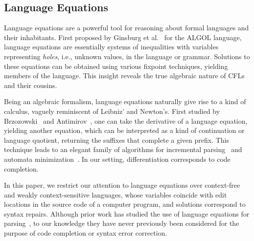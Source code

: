 \documentclass[sigplan,review,anonymous,acmsmall]{acmart}\settopmatter{printfolios=false,printccs=false,printacmref=false}
\begin{document}


\subsection{Language Equations}

Language equations are a powerful tool for reasoning about formal languages and their inhabitants. First proposed by Ginsburg et al.~\cite{ginsburg1962two} for the ALGOL language, language equations are essentially systems of inequalities with variables representing \textit{holes}, i.e., unknown values, in the language or grammar. Solutions to these equations can be obtained using various fixpoint techniques, yielding members of the language. This insight reveals the true algebraic nature of CFLs and their cousins.

Being an algebraic formalism, language equations naturally give rise to a kind of calculus, vaguely reminiscent of Leibniz' and Newton's. First studied by Brzozowski~\cite{brzozowski1964derivatives, brzozowski1980equations} and Antimirov~\cite{antimirov1996partial}, one can take the derivative of a language equation, yielding another equation, which can be interpreted as a kind of continuation or language quotient, returning the suffixes that complete a given prefix. This technique leads to an elegant family of algorithms for incremental parsing~\cite{might2011parsing, adams2016complexity} and automata minimization~\cite{brzozowski1962canonical}. In our setting, differentiation corresponds to code completion.

In this paper, we restrict our attention to language equations over context-free and weakly context-sensitive languages, whose variables coincide with edit locations in the source code of a computer program, and solutions correspond to syntax repairs. Although prior work has studied the use of language equations for parsing~\cite{might2011parsing}, to our knowledge they have never previously been considered for the purpose of code completion or syntax error correction.


\end{document}
